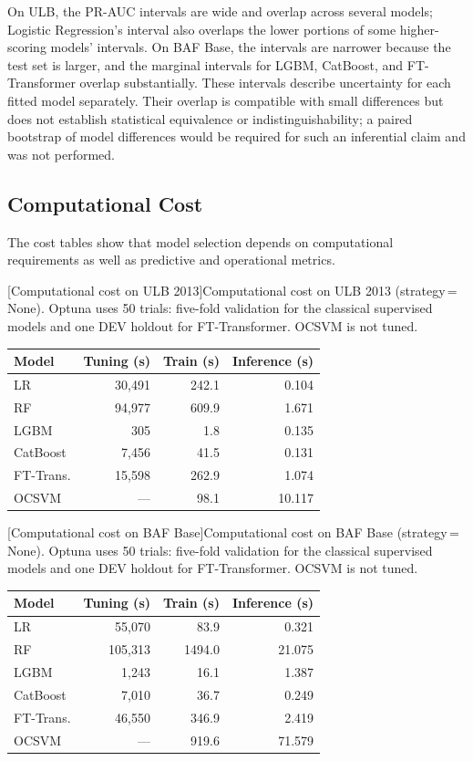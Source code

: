 On ULB, the PR-AUC intervals are wide and overlap across several models; Logistic Regression's interval also overlaps the lower portions of some higher-scoring models' intervals. On BAF Base, the intervals are narrower because the test set is larger, and the marginal intervals for LGBM, CatBoost, and FT-Transformer overlap substantially. These intervals describe uncertainty for each fitted model separately. Their overlap is compatible with small differences but does not establish statistical equivalence or indistinguishability; a paired bootstrap of model differences would be required for such an inferential claim and was not performed.

\subsection{Computational Cost}

The cost tables show that model selection depends on computational requirements as well as predictive and operational metrics.

\noindent\begin{minipage}{\linewidth}\centering
{}[Computational cost on ULB 2013]{Computational cost on ULB 2013 (strategy\,=\,None). Optuna uses 50 trials: five-fold validation for the classical supervised models and one DEV holdout for FT-Transformer. OCSVM is not tuned.}
\label{tab:cost_ulb}
\begin{tabular}{l r r r}
\toprule
Model & Tuning (s) & Train (s) & Inference (s) \\
\midrule
LR         & 30,491 & 242.1 & 0.104 \\
RF         & 94,977 & 609.9 & 1.671 \\
LGBM       & 305 & 1.8 & 0.135 \\
CatBoost   & 7,456 & 41.5 & 0.131 \\
FT-Trans.  & 15,598 & 262.9 & 1.074 \\
OCSVM      & --- & 98.1 & 10.117 \\
\bottomrule
\end{tabular}
\end{minipage}

\noindent\begin{minipage}{\linewidth}\centering
{}[Computational cost on BAF Base]{Computational cost on BAF Base (strategy\,=\,None). Optuna uses 50 trials: five-fold validation for the classical supervised models and one DEV holdout for FT-Transformer. OCSVM is not tuned.}
\label{tab:cost_baf}
\begin{tabular}{l r r r}
\toprule
Model & Tuning (s) & Train (s) & Inference (s) \\
\midrule
LR         & 55,070 & 83.9 & 0.321 \\
RF         & 105,313 & 1494.0 & 21.075 \\
LGBM       & 1,243 & 16.1 & 1.387 \\
CatBoost   & 7,010 & 36.7 & 0.249 \\
FT-Trans.  & 46,550 & 346.9 & 2.419 \\
OCSVM      & --- & 919.6 & 71.579 \\
\bottomrule
\end{tabular}
\end{minipage}

